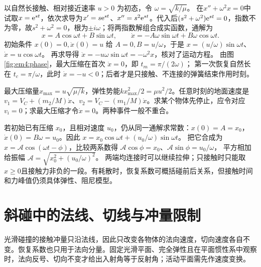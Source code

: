 以自然长接触、相对接近速率 $u>0$ 为初态，令 $\omega=\sqrt{k/\mu}$。
在$x''+\omega^2x=0$中试取$x=\mathrm e^{st}$，依次求导为$x'=s\mathrm e^{st}$、$x''=s^2\mathrm e^{st}$。代入后$(s^2+\omega^2)\mathrm e^{st}=0$，指数不为零，故$s^2+\omega^2=0$，根为$\pm i\omega$；将两指数解组合成实函数，通解为
\[
x=A\cos\omega t+B\sin\omega t,\qquad
\dot x=-A\omega\sin\omega t+B\omega\cos\omega t.
\]
初始条件 $x(0)=0,\dot x(0)=u$ 给 $A=0,B=u/\omega$，于是
$x=(u/\omega)\sin\omega t$、$\dot x=u\cos\omega t$。
再求导得 $\ddot x=-u\omega\sin\omega t=-\omega^2x$，核对了运动方程。
由图\ref{fig:em4:phase}，最大压缩在首次 $\dot x=0$，即 $t_m=\pi/(2\omega)$；
第一次恢复自然长在 $t_c=\pi/\omega$，此时 $\dot x=-u<0$；后者才是只接触、不连接的弹簧结束作用时刻。


最大压缩量$x_{\max}=u\sqrt{\mu/k}$，弹性势能$kx_{\max}^2/2=\mu u^2/2$。任意时刻的地面速度是$v_1=V_C+(m_2/M)\dot x$、$v_2=V_C-(m_1/M)\dot x$。求某个物体先停止，应令对应$v_i=0$；求最大压缩才令$\dot x=0$。两种事件一般不重合。

若初始已有压缩 $x_0$，且相对速度 $u_0$，仍从同一通解求常数：$x(0)=A=x_0$，$\dot x(0)=B\omega=u_0$。因此
$x=x_0\cos\omega t+(u_0/\omega)\sin\omega t$。
把它合成为 $x=\mathcal A\cos(\omega t-\phi)$，比较两系数得
$\mathcal A\cos\phi=x_0$、$\mathcal A\sin\phi=u_0/\omega$，
平方相加给振幅 $\mathcal A=\sqrt{x_0^2+(u_0/\omega)^2}$。
两端均连接时可以继续拉伸；只接触时只能取$x\ge0$且接触力非负的一段。有耗散时，恢复系数可概括碰前后关系，但接触时间和力峰值仍须具体弹性、阻尼模型。

\section{斜碰中的法线、切线与冲量限制}

光滑碰撞的接触冲量只沿法线，因此只改变各物体的法向速度，切向速度各自不变。恢复系数也只用于法向分量。固定光滑平面、完全弹性且在平面惯性系中观察时，法向反号、切向不变才给出入射角等于反射角；活动平面需先作速度变换。

